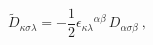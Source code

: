 \begin{equation}
{\tilde{D}}_{\kappa \sigma \lambda }=-\frac{1}{2}\epsilon _{\kappa \lambda
}{}^{\alpha \beta }\,D_{\alpha \sigma \beta }\ ,  \label{DUALTR1}
\end{equation}%
